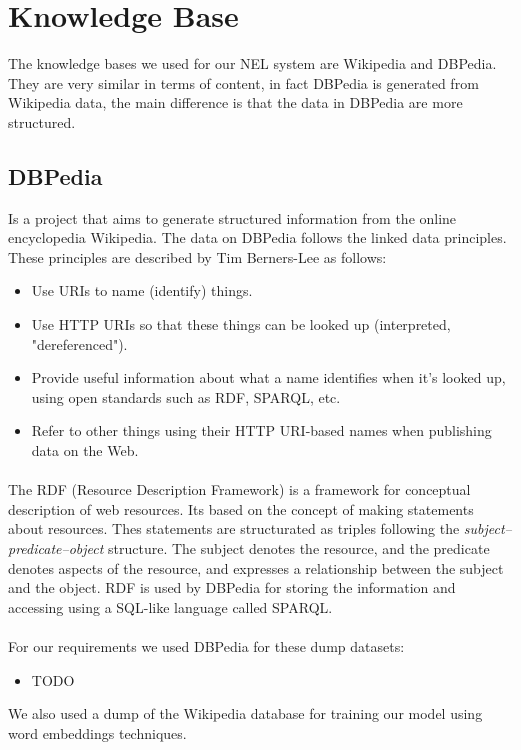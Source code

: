 \section{Knowledge Base}
The knowledge bases we used for our NEL system are Wikipedia and DBPedia. They are very similar in terms of content, in fact DBPedia is generated from Wikipedia data, the main difference is that the data in DBPedia are more structured. 

\subsection{DBPedia}
Is a project that aims to generate structured information from the online encyclopedia Wikipedia. The data on DBPedia follows the linked data principles. These principles are described by Tim Berners-Lee as follows:

\begin{itemize}[itemsep = 0.1em]
\item Use URIs to name (identify) things.
\item Use HTTP URIs so that these things can be looked up (interpreted, "dereferenced").
\item Provide useful information about what a name identifies when it's looked up, using open standards such as RDF, SPARQL, etc.
\item Refer to other things using their HTTP URI-based names when publishing data on the Web.
\end{itemize}

\paragraph{}
The RDF (Resource Description Framework) is a framework for conceptual description of web resources. Its based on the concept of making statements about resources. Thes statements are structurated as triples following the \textit{subject–predicate–object} structure. The subject denotes the resource, and the predicate denotes aspects of the resource, and expresses a relationship between the subject and the object. RDF is used by DBPedia for storing the information and accessing using a SQL-like language called SPARQL.

\paragraph{}
For our requirements we used DBPedia for these dump datasets:
\begin{itemize}
\item TODO
\end{itemize} 
We also used a dump of the Wikipedia database for training our model using word embeddings techniques.
\pagebreak


